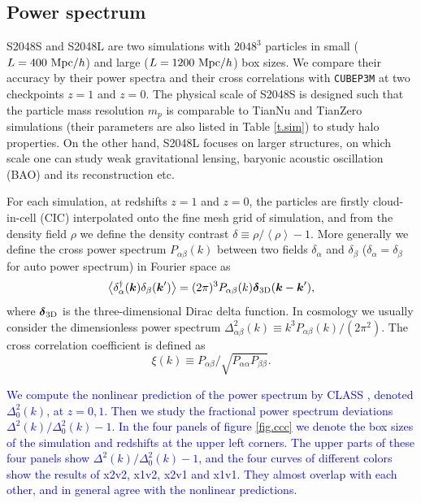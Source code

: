 \documentclass[10pt,twocolumn,preprint]{emulateapj}
\newcommand{\bs}{\boldsymbol}
\newcommand{\tcb}{\textcolor{blue}}
\begin{document}
\subsection{Power spectrum}

S2048S and S2048L are two simulations with $2048^3$ particles in small ($L=400\ {\rm Mpc}/h$) and large ($L=1200\ {\rm Mpc}/h$) box sizes. We compare their accuracy by their power spectra and their cross correlations with {\tt CUBEP3M} at two checkpoints $z=1$ and $z=0$. The physical scale of S2048S is designed such that the particle mass resolution $m_p$ is comparable to TianNu and TianZero simulations (their parameters are also listed in Table \ref{t.sim}) to study halo properties. On the other hand, S2048L focuses on larger structures, on which scale one can study weak gravitational lensing, baryonic acoustic oscillation (BAO) \citep{2005ApJ...633..560E} and its reconstruction \citep{2007ApJ...664..675E,2017ApJ...841L..29W} etc.

For each simulation, at redshifts $z=1$ and $z=0$, the particles are firstly cloud-in-cell (CIC) interpolated onto the fine mesh grid of simulation, and from the density field $\rho$ we define the density contrast $\delta\equiv \rho/\left\langle \rho \right\rangle-1$. More generally we define the cross power spectrum $P_{\alpha\beta}(k)$ between two fields $\delta_\alpha$ and $\delta_\beta$ ($\delta_\alpha=\delta_\beta$ for auto power spectrum) in Fourier space as
\begin{equation}\label{eq.cps}
	\left\langle \delta_\alpha^\dagger({\bs k})\delta_\beta({\bs k}') \right\rangle=
    (2\pi)^3 P_{\alpha\beta}(k){\bs \delta}_{\rm 3D}({\bs k}-{\bs k}'),
\end{equation}
where ${\bs \delta}_{\rm 3D}$ is the three-dimensional Dirac delta function. In cosmology we usually consider the dimensionless power spectrum $\Delta^2_{\alpha\beta}(k)\equiv k^3 P_{\alpha\beta}(k)/(2\pi^2)$. The cross correlation coefficient is defined as
\begin{equation}\label{eq.ccc}
	\xi(k)\equiv P_{\alpha\beta}/\sqrt{P_{\alpha\alpha}P_{\beta\beta}}.
\end{equation}

\tcb{We compute the nonlinear prediction of the power spectrum by CLASS \citep{2011JCAP...07..034B}, denoted $\Delta^2_0(k)$, at $z=0,1$. Then we study the fractional power spectrum deviations $\Delta^2(k)/\Delta^2_0(k)-1$. In the four panels of figure \ref{fig.ccc} we denote the box sizes of the simulation and redshifts at the upper left corners. The upper parts of these four panels show $\Delta^2(k)/\Delta^2_0(k)-1$, and the four curves of different colors show the results of x2v2, x1v2, x2v1 and x1v1. They almost overlap with each other, and in general agree with the nonlinear predictions.}
\end{document}
